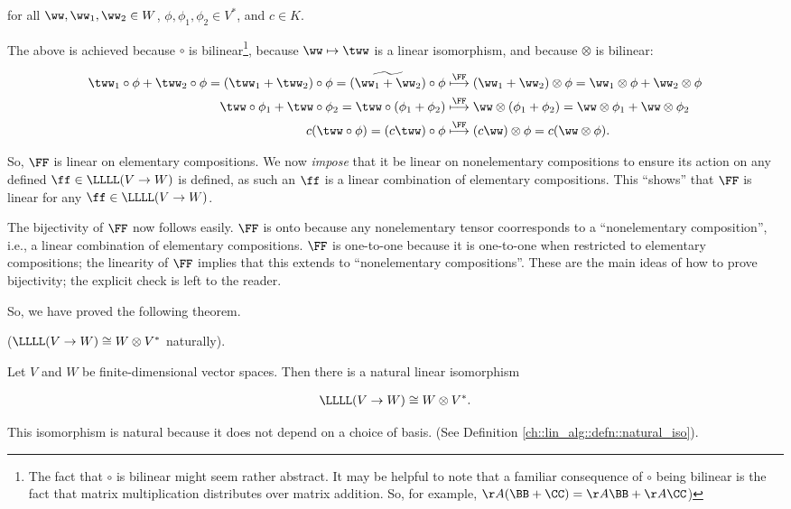 \begin{deriv}
    for all $\ww, \ww_1, \ww_2 \in W$, $\phi, \phi_1, \phi_2 \in V^*$, and $c \in K$.
    
    The above is achieved because $\circ$ is bilinear\footnote{The fact that $\circ$ is bilinear might seem rather abstract. It may be helpful to note that a familiar consequence of $\circ$ being bilinear is the fact that matrix multiplication distributes over matrix addition. So, for example, $\AA(\BB + \CC) = \AA \BB + \AA \CC$)}, because $\ww \mapsto \tww$ is a linear isomorphism, and because $\otimes$ is bilinear:
    
    \begin{align*}
        \tww_1 \circ \phi + \tww_2 \circ \phi 
        = (\tww_1 + \tww_2) \circ \phi
        = \widetilde{(\ww_1 + \ww_2)} \circ \phi
        &\overset{\FF}{\longmapsto}
        (\ww_1 + \ww_2) \otimes \phi = \ww_1 \otimes \phi + \ww_2 \otimes \phi
        \\
        \tww \circ \phi_1 + \tww \circ \phi_2 
        = \tww \circ (\phi_1 + \phi_2)
        &\overset{\FF}{\longmapsto}
        \ww \otimes (\phi_1 + \phi_2)
        = \ww \otimes \phi_1 + \ww \otimes \phi_2
        \\
        c (\tww \circ \phi)
        = (c \tww) \circ \phi
        &\overset{\FF}{\longmapsto}
        (c \ww) \otimes \phi
        = c (\ww \otimes \phi).
    \end{align*}
    
    So, $\FF$ is linear on elementary compositions. We now \textit{impose} that it be linear on nonelementary compositions to ensure its action on any defined $\ff \in \LLLL(V \rightarrow W)$ is defined, as such an $\ff$ is a linear combination of elementary compositions. This ``shows'' that $\FF$ is linear for any $\ff \in \LLLL(V \rightarrow W)$.
    
    The bijectivity of $\FF$ now follows easily. $\FF$ is onto because any nonelementary tensor coorresponds to a ``nonelementary composition'', i.e., a linear combination of elementary compositions. $\FF$ is one-to-one because it is one-to-one when restricted to elementary compositions; the linearity of $\FF$ implies that this extends to ``nonelementary compositions''. These are the main ideas of how to prove bijectivity; the explicit check is left to the reader.
\end{deriv}

So, we have proved the following theorem.

\begin{theorem}
\label{ch::motivated_intro::thm::lin_V_W_iso_W_otimes_V}
    ($\LLLL(V \rightarrow W) \cong W \otimes V^*$ naturally). 
    
    Let $V$ and $W$ be finite-dimensional vector spaces. Then there is a natural linear isomorphism
    
    \begin{align*}
        \LLLL(V \rightarrow W) \cong W \otimes V^*.
    \end{align*}
    
    This isomorphism is natural because it does not depend on a choice of basis. (See Definition \ref{ch::lin_alg::defn::natural_iso}).
\end{theorem}

